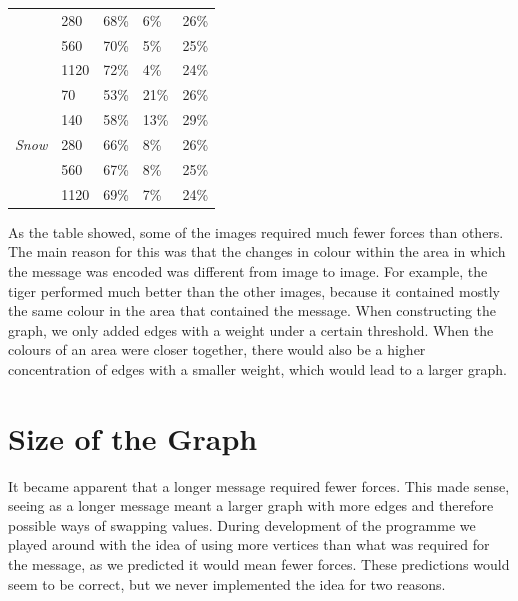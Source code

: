\begin{table}[H]
{\begin{tabular}{@{}lllll@{}}
                                                & 280                     & 68\%           & 6\%             & 26\%                 \\
                                                & 560                     & 70\%           & 5\%             & 25\%                 \\
                                                & 1120                    & 72\%           & 4\%             & 24\%                 \\ \midrule
            \multirow{5}{*}{\textit{Snow}}      & 70                      & 53\%           & 21\%            & 26\%                 \\
                                                & 140                     & 58\%           & 13\%            & 29\%                 \\
                                                & 280                     & 66\%           & 8\%             & 26\%                 \\
                                                & 560                     & 67\%           & 8\%             & 25\%                 \\
                                                & 1120                    & 69\%           & 7\%             & 24\%                 \\ \bottomrule
        \end{tabular}
    }
\end{table}

As the table showed, some of the images required much fewer forces than others.
The main reason for this was that the changes in colour within the area in which the message was encoded was different from image to image.
For example, the tiger performed much better than the other images, because it contained mostly the same colour in the area that contained the message.
When constructing the graph, we only added edges with a weight under a certain threshold.
When the colours of an area were closer together, there would also be a higher concentration of edges with a smaller weight, which would lead to a larger graph.

\section{Size of the Graph}
It became apparent that a longer message required fewer forces. 
This made sense, seeing as a longer message meant a larger graph with more edges and therefore possible ways of swapping values.
During development of the programme we played around with the idea of using more vertices than what was required for the message, as we predicted it would mean fewer forces.
These predictions would seem to be correct, but we never implemented the idea for two reasons.

